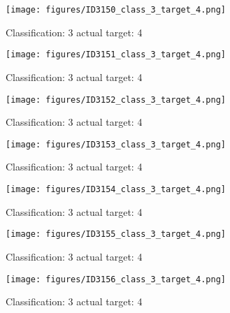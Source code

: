 \begin{figure}[h!]
\begin{center}
\texttt{[image: figures/ID3150\_class\_3\_target\_4.png]}
\end{center}
\caption{ Classification: 3 actual target: 4}
\label{fig:ID3150_class_3_target_4}
\end{figure}
\begin{figure}[h!]
\begin{center}
\texttt{[image: figures/ID3151\_class\_3\_target\_4.png]}
\end{center}
\caption{ Classification: 3 actual target: 4}
\label{fig:ID3151_class_3_target_4}
\end{figure}
\begin{figure}[h!]
\begin{center}
\texttt{[image: figures/ID3152\_class\_3\_target\_4.png]}
\end{center}
\caption{ Classification: 3 actual target: 4}
\label{fig:ID3152_class_3_target_4}
\end{figure}
\begin{figure}[h!]
\begin{center}
\texttt{[image: figures/ID3153\_class\_3\_target\_4.png]}
\end{center}
\caption{ Classification: 3 actual target: 4}
\label{fig:ID3153_class_3_target_4}
\end{figure}
\begin{figure}[h!]
\begin{center}
\texttt{[image: figures/ID3154\_class\_3\_target\_4.png]}
\end{center}
\caption{ Classification: 3 actual target: 4}
\label{fig:ID3154_class_3_target_4}
\end{figure}
\begin{figure}[h!]
\begin{center}
\texttt{[image: figures/ID3155\_class\_3\_target\_4.png]}
\end{center}
\caption{ Classification: 3 actual target: 4}
\label{fig:ID3155_class_3_target_4}
\end{figure}
\begin{figure}[h!]
\begin{center}
\texttt{[image: figures/ID3156\_class\_3\_target\_4.png]}
\end{center}
\caption{ Classification: 3 actual target: 4}
\label{fig:ID3156_class_3_target_4}
\end{figure}
